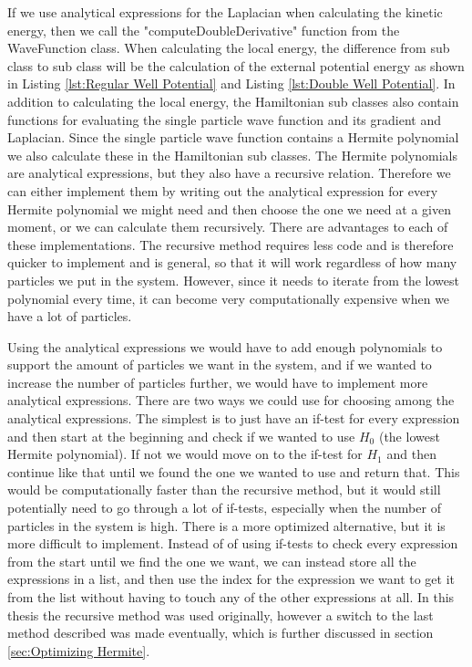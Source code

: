\documentclass[../main.tex]{subfiles}
\begin{document}
If we use analytical expressions for the Laplacian when calculating the kinetic energy, then we call the "computeDoubleDerivative" function from the WaveFunction class. When calculating the local energy, the difference from sub class to sub class will be the calculation of the external potential energy as shown in Listing \ref{lst:Regular Well Potential} and Listing \ref{lst:Double Well Potential}. In addition to calculating the local energy, the Hamiltonian sub classes also contain functions for evaluating the single particle wave function and its gradient and Laplacian. Since the single particle wave function contains a Hermite polynomial we also calculate these in the Hamiltonian sub classes. The Hermite polynomials are analytical expressions, but they also have a recursive relation. Therefore we can either implement them by writing out the analytical expression for every Hermite polynomial we might need and then choose the one we need at a given moment, or we can calculate them recursively. There are advantages to each of these implementations. The recursive method requires less code and is therefore quicker to implement and is general, so that it will work regardless of how many particles we put in the system. However, since it needs to iterate from the lowest polynomial every time, it can become very computationally expensive when we have a lot of particles. 

Using the analytical expressions we would have to add enough polynomials to support the amount of particles we want in the system, and if we wanted to increase the number of particles further, we would have to implement more analytical expressions. There are two ways we could use for choosing among the analytical expressions. The simplest is to just have an if-test for every expression and then start at the beginning and check if we wanted to use $H_0$ (the lowest Hermite polynomial). If not we would move on to the if-test for $H_1$ and then continue like that until we found the one we wanted to use and return that. This would be computationally faster than the recursive method, but it would still potentially need to go through a lot of if-tests, especially when the number of particles in the system is high. There is a more optimized alternative, but it is more difficult to implement. Instead of of using if-tests to check every expression from the start until we find the one we want, we can instead store all the expressions in a list, and then use the index for the expression we want to get it from the list without having to touch any of the other expressions at all. In this thesis the recursive method was used originally, however a switch to the last method described was made eventually, which is further discussed in section \ref{sec:Optimizing Hermite}.
\end{document}
